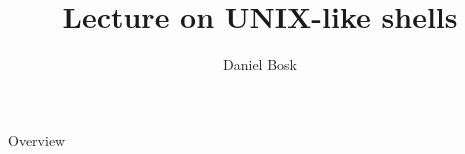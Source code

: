 \documentclass[handout]{beamer}
\title[UNIX-like shells]{%
	Lecture on UNIX-like shells
}
\author{Daniel Bosk}
\institute{%
	Department of Information Technology and Media (ITM),\\
	Mid Sweden University, Sundsvall.
}
\date{\svnId}
\begin{document}
\begin{frame}
  \titlepage
\end{frame}

\begin{frame}{Overview}
	\tableofcontents
\end{frame}



\end{document}
